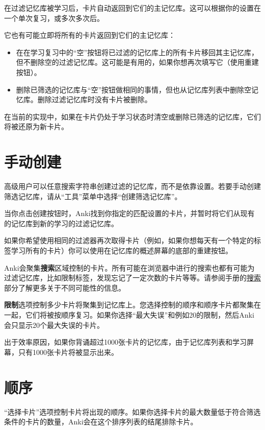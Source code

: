 \documentclass[a4paper]{book}
\begin{document}
		在过滤记忆库被学习后，卡片自动返回到它们的主记忆库。这可以根据你的设置在一个单次复习，或多次多次后。
		
		它也有可能立即将所有的卡片返回到它们的主记忆库：
		
		\begin{itemize}
			\itemsep1pt\parskip0pt
			\item 在在学习复习中的“空”按钮将已过滤的记忆库上的所有卡片移回其主记忆库，但不删除空的过滤记忆库。这可能是有用的，如果你想再次填写它（使用重建按钮）。
			\item 删除已筛选的记忆库与“空”按钮做相同的事情，但也从记忆库列表中删除空记忆库。删除过滤记忆库时没有卡片被删除。
		\end{itemize}
		
		
		\begin{shaded}
			在当前的实现中，如果在卡片仍处于学习状态时清空或删除已筛选的记忆库，它们将被还原为新卡片。
		\end{shaded}
		
		\section{手动创建}
		高级用户可以任意搜索字符串创建过滤的记忆库，而不是依靠设置。若要手动创建筛选记忆库，请从“工具”菜单中选择“创建筛选记忆库”。
		
		当你点击创建按钮时，Anki找到你指定的匹配设置的卡片，并暂时将它们从现有的记忆库到新的学习的过滤记忆库。
		
		如果你希望使用相同的过滤器再次取得卡片（例如，如果你想每天有一个特定的标签学习所有的卡片）你可以使用在记忆库的概述屏幕的底部的重建按钮。
		
		Anki会聚集\textbf{搜索}区域控制的卡片。所有可能在浏览器中进行的搜索也都有可能为过滤记忆库，比如限制标签，发现忘记了一定次数的卡片等等。请参阅手册的\hyperref[searching]{搜索}部分了解更多关于不同可能性的信息。
		
		\textbf{限制}选项控制多少卡片将聚集到记忆库上。您选择控制的顺序和顺序卡片都聚集在一起，它们将被按顺序复习。如果你选择“最大失误”和例如20的限制，然后Anki会只显示20个最大失误的卡片。
		
		出于效率原因，如果你背诵超过1000张卡片的记忆库，由于记忆库列表和学习屏幕，只有1000张卡片将被显示出来。
		
		\section{顺序}
		
		“选择卡片”选项控制卡片将出现的顺序。如果你选择卡片的最大数量低于符合筛选条件的卡片的数量，Anki会在这个排序列表的结尾排除卡片。
		
\end{document}
